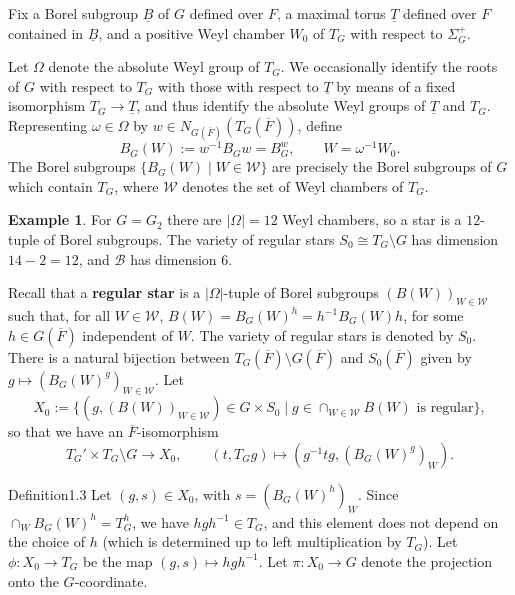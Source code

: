 \documentclass[12pt,letterpaper]{amsart}
\theoremstyle{plain}
\theoremstyle{definition}
\theoremstyle{remark}
\theoremstyle{definition}
\newtheorem*{example}{Example}
\newcommand{\ovF}{\overline{F}}
\begin{document}
Fix a Borel subgroup $\underline{B}$ of $G$ defined over ${F}$, a maximal
torus $\underline{T}$ defined over $F$ contained in $\underline{B}$,
and a positive Weyl chamber $W_0$ of $T_G$ with respect to
$\Sigma_G^+$.

Let $\Omega$ denote the absolute Weyl group of $T_G$.
We occasionally identify the roots of $G$ with respect to $T_G$
with those with respect to $\underline{T}$ by means of
a fixed isomorphism $T_G\rightarrow \underline{T}$, and thus identify
the absolute Weyl groups of $\underline{T}$ and $T_G$.
Representing $\omega\in \Omega$ by
$w\in N_{G(\overline{F})}({T}_G(\overline{F}))$, define
\[
{B}_G(W):=w^{-1}{B}_Gw={B}_G^w,
\qquad W=\omega^{-1}W_0.
\]
The Borel subgroups
$\{{B}_G(W)\mid W\in {\mathcal W}\}$ are precisely the Borel
subgroups of $G$ which contain ${T}_G$, where ${\mathcal W}$ denotes
the set of Weyl chambers of $T_G$.

\begin{example}
For $G=G_2$ there are $|\Omega|=12$ Weyl chambers, so a star is a $12$-tuple
of Borel subgroups. The variety of regular stars $S_0\cong T_G\setminus G$ has
dimension $14-2=12$, and ${\mathcal B}$ has dimension $6$.
\end{example}

Recall that a \textbf{regular star} is a $|\Omega|$-tuple of Borel subgroups
$(B(W))_{W\in {\mathcal W}}$ such that, for all $W\in {\mathcal W}$,
$B(W)={B}_G(W)^h=h^{-1}{B}_G(W)h$, for some
$h\in G(\overline{F})$ independent of $W$.
The variety of regular stars is denoted by $S_0$.
There is a natural bijection between $T_G(\ovF)\setminus G(\ovF)$
and $S_0(\ovF)$ given by $g\longmapsto (B_G(W)^g)_{W\in {\mathcal W}}$.
Let
\begin{equation}\tag{1.1}\label{eq:1.1}
X_0:=\{(g,(B(W))_{W\in {\mathcal W}})\in G\times S_0 \mid
g\in\cap_{W\in {\mathcal W}}B(W)\text{ is regular}\},
\end{equation}
so that we have an $\overline{F}$-isomorphism
\begin{equation}\tag{1.2}\label{eq:1.2}
T_G'\times T_G\setminus G\rightarrow X_0,\qquad
(t,T_Gg)\longmapsto (g^{-1}tg,({B}_G(W)^g)_W).
\end{equation}

\begin{resdef}{Definition}{1.3}\label{res:1.3}
Let $(g,s)\in X_0$, with $s=(B_G(W)^h)_W$. Since
$\cap_W B_G(W)^h=T_G^h$, we have $hgh^{-1}\in T_G$, and this element
does not depend on the choice of $h$ (which is determined up to left
multiplication by $T_G$). Let $\phi:X_0\rightarrow T_G$ be the map
$(g,s)\mapsto hgh^{-1}$. Let $\pi :X_0\rightarrow G$ denote the projection
onto the $G$-coordinate.
\end{resdef}
\end{document}

